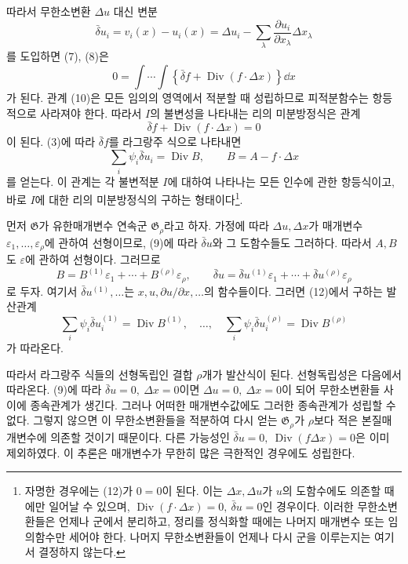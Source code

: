 따라서 무한소변환 \(\Delta u\) 대신 변분
\begin{equation}
\tag{9}
\bar\delta u_i=v_i(x)-u_i(x)
=\Delta u_i-\sum_\lambda
\frac{\partial u_i}{\partial x_\lambda}\Delta x_\lambda
\end{equation}
를 도입하면 (7), (8)은
\begin{equation}
\tag{10}
0=\int\!\cdots\!\int
\left\{\bar\delta f+\operatorname{Div}(f\cdot\Delta x)\right\}\dd x
\end{equation}
가 된다. 관계 (10)은 모든 임의의 영역에서 적분할 때 성립하므로 피적분함수는 항등적으로 사라져야 한다. 따라서 \(I\)의 불변성을 나타내는 리의 미분방정식은 관계
\begin{equation}
\tag{11}
\bar\delta f+\operatorname{Div}(f\cdot\Delta x)=0
\end{equation}
이 된다. (3)에 따라 \(\bar\delta f\)를 라그랑주 식으로 나타내면
\begin{equation}
\tag{12}
\sum_i\psi_i\bar\delta u_i=\operatorname{Div}B,
\qquad B=A-f\cdot\Delta x
\end{equation}
를 얻는다. 이 관계는 각 불변적분 \(I\)에 대하여 나타나는 모든 인수에 관한 항등식이고, 바로 \(I\)에 대한 리의 미분방정식의 구하는 형태이다\footnote{자명한 경우에는 (12)가 \(0=0\)이 된다. 이는 \(\Delta x,\Delta u\)가 \(u\)의 도함수에도 의존할 때에만 일어날 수 있으며, \(\operatorname{Div}(f\cdot\Delta x)=0,\ \bar\delta u=0\)인 경우이다. 이러한 무한소변환들은 언제나 군에서 분리하고, 정리를 정식화할 때에는 나머지 매개변수 또는 임의함수만 세어야 한다. 나머지 무한소변환들이 언제나 다시 군을 이루는지는 여기서 결정하지 않는다.}.

먼저 \(\mathfrak G\)가 유한매개변수 연속군 \(\mathfrak G_\rho\)라고 하자. 가정에 따라 \(\Delta u,\Delta x\)가 매개변수 \(\varepsilon_1,\ldots,\varepsilon_\rho\)에 관하여 선형이므로, (9)에 따라 \(\bar\delta u\)와 그 도함수들도 그러하다. 따라서 \(A,B\)도 \(\varepsilon\)에 관하여 선형이다. 그러므로
\[
B=B^{(1)}\varepsilon_1+\cdots+B^{(\rho)}\varepsilon_\rho,\qquad
\bar\delta u=\bar\delta u^{(1)}\varepsilon_1+\cdots+
\bar\delta u^{(\rho)}\varepsilon_\rho
\]
로 두자. 여기서 \(\bar\delta u^{(1)},\ldots\)는 \(x,u,\partial u/\partial x,\ldots\)의 함수들이다. 그러면 (12)에서 구하는 발산관계
\begin{equation}
\tag{13}
\sum_i\psi_i\bar\delta u_i^{(1)}=\operatorname{Div}B^{(1)},
\quad\ldots,\quad
\sum_i\psi_i\bar\delta u_i^{(\rho)}=\operatorname{Div}B^{(\rho)}
\end{equation}
가 따라온다.

따라서 라그랑주 식들의 선형독립인 결합 \(\rho\)개가 발산식이 된다. 선형독립성은 다음에서 따라온다. (9)에 따라 \(\bar\delta u=0,\ \Delta x=0\)이면 \(\Delta u=0,\ \Delta x=0\)이 되어 무한소변환들 사이에 종속관계가 생긴다. 그러나 어떠한 매개변수값에도 그러한 종속관계가 성립할 수 없다. 그렇지 않으면 이 무한소변환들을 적분하여 다시 얻는 \(\mathfrak G_\rho\)가 \(\rho\)보다 적은 본질매개변수에 의존할 것이기 때문이다. 다른 가능성인 \(\bar\delta u=0,\ \operatorname{Div}(f\Delta x)=0\)은 이미 제외하였다. 이 추론은 매개변수가 무한히 많은 극한적인 경우에도 성립한다.

